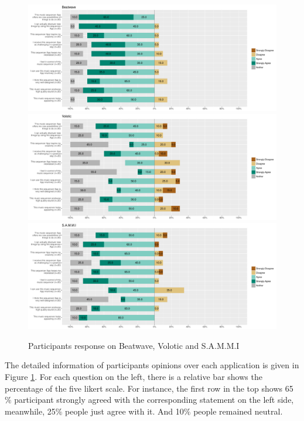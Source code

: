 \bigskip
\begin{figure}[h]
 \centering
 \includegraphics[width = \textwidth]{images/Beatwave.pdf}
 \includegraphics[width = \textwidth]{images/Volotic.pdf}
 \includegraphics[width = \textwidth]{images/SAMMI.pdf}
 \caption{Participants response on Beatwave, Volotic and S.A.M.M.I}
 \label{fig:result_response}
\end{figure}
\bigskip

The detailed information of participants opinions over each application is given in Figure \ref{fig:result_response}. For each question on the left, there is a relative bar shows the percentage of the five likert scale. For instance, the first row in the top shows 65$\%$ participant strongly agreed with the corresponding statement on the left side, meanwhile, 25$\%$ people just agree with it. And 10$\%$ people remained neutral.

